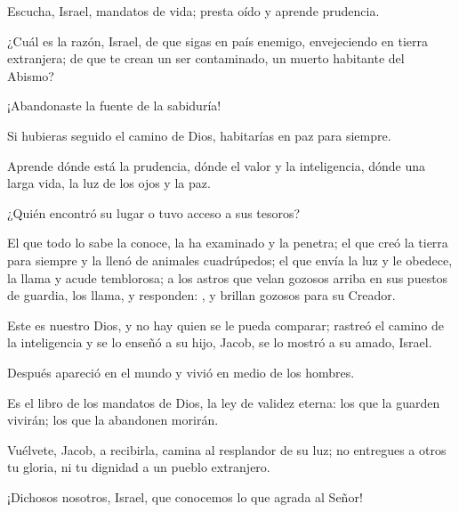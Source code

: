 
 


\begin{readprose}
Escucha, Israel, mandatos de vida; 
   presta oído y aprende prudencia. 

¿Cuál es la razón, Israel, 
   de que sigas en país enemigo, 
   envejeciendo en tierra extranjera; 
   de que te crean un ser contaminado, 
   un muerto habitante del Abismo? 
   
¡Abandonaste la fuente de la sabiduría!

Si hubieras seguido el camino de Dios, 
   habitarías en paz para siempre.
   
Aprende dónde está la prudencia, 
   dónde el valor y la inteligencia, 
   dónde una larga vida, 
   la luz de los ojos y la paz.
   
¿Quién encontró su lugar 
   o tuvo acceso a sus tesoros?
   
El que todo lo sabe la conoce, 
   la ha examinado y la penetra; 
   el que creó la tierra para siempre 
   y la llenó de animales cuadrúpedos; 
   el que envía la luz y le obedece, 
   la llama y acude temblorosa; 
   a los astros que velan gozosos 
   arriba en sus puestos de guardia, 
   los llama, y responden: , 
   y brillan gozosos para su Creador. 
   
Este es nuestro Dios, 
   y no hay quien se le pueda comparar; 
   rastreó el camino de la inteligencia 
   y se lo enseñó a su hijo, Jacob, 
   se lo mostró a su amado, Israel. 
   
Después apareció en el mundo 
   y vivió en medio de los hombres. 
   
Es el libro de los mandatos de Dios, 
   la ley de validez eterna: 
   los que la guarden vivirán; 
   los que la abandonen morirán. 
   
Vuélvete, Jacob, a recibirla, 
   camina al resplandor de su luz; 
   no entregues a otros tu gloria, 
   ni tu dignidad a un pueblo extranjero. 
   
¡Dichosos nosotros, Israel, 
   que conocemos lo que agrada al Señor!
\end{readprose}



 


